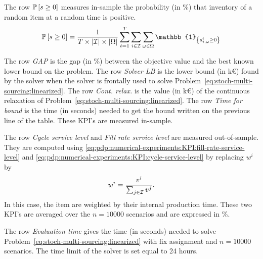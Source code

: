 The row $\prob\sqbracket{s\ge0}$ measures in-sample the probability (in \%) that inventory of a random item at a random time is positive.
\begin{equation}
  \prob\sqbracket{s\ge0}=\frac{1}{\horizon\times\card{\REF}\times\card{\scenarios}}\sum_{t=1}^{\horizon}\sum_{i\in\REF}\sum_{\omega\in\scenarios} \mathbb{1}_{\crbracket{\inventory_{t,\omega}^i\ge0}}
\end{equation}


The row \emph{GAP} is the gap (in \%) between the objective value and the best known lower bound on the problem.
The row \emph{Solver LB} is the lower bound (in k\euro{}) found by the solver when the solver is frontally used to solve Problem~\eqref{eq:stoch-multi-sourcing:linearized}.
The row \emph{Cont. relax.} is the value (in k\euro{}) of the continuous relaxation of Problem~\eqref{eq:stoch-multi-sourcing:linearized}.
The row \emph{Time for bound} is the time (in seconds) needed to get the bound written on the previous line of the table.
These KPI's are measured in-sample.


The row \emph{Cycle service level} and \emph{Fill rate service level} are measured out-of-sample.
They are computed using \cref{eq:pdp:numerical-experiments:KPI:fill-rate-service-level} and \cref{eq:pdp:numerical-experiments:KPI:cycle-service-level} by replacing $w^i$ by
\begin{equation}\label{eq:multi-sourcing:numerical-experiments:KPI:weight}
  w^i=\frac{v^i}{\sum_{j\in\mathcal{I}}v^j}.
\end{equation}
In this case, the item are weighted by their internal production time.
These two KPI's are averaged over the $n=10000$ scenarios and are expressed in \%.


The row \emph{Evaluation time} gives the time (in seconds) needed to solve Problem~\eqref{eq:stoch-multi-sourcing:linearized} with fix assignment and $n=10000$ scenarios.
The time limit of the solver is set equal to 24 hours.


